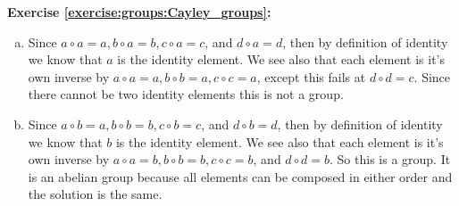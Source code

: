 \noindent\textbf{Exercise \ref{exercise:groups:Cayley_groups}:}
\begin{enumerate}[(a)]

\item
Since $a \circ a = a, b \circ a = b, c \circ a = c$, and $d \circ a = d$, then by definition of identity we know that $a$ is the identity element.  We see also that each element is it's own inverse by $a \circ a = a, b \circ b = a, c \circ c = a$, except this fails at $d \circ d = c$.  Since there cannot be two identity elements this is not a group.

\item
Since $a \circ b = a, b \circ b = b, c \circ b = c$, and $d \circ b = d$, then by definition of identity we know that $b$ is the identity element.  We see also that each element is it's own inverse by $a \circ a = b, b \circ b = b, c \circ c = b$, and $d \circ d = b$.  So this is a group.  It is an abelian group because all elements can be composed in either order and the solution is the same.


\end{enumerate}
